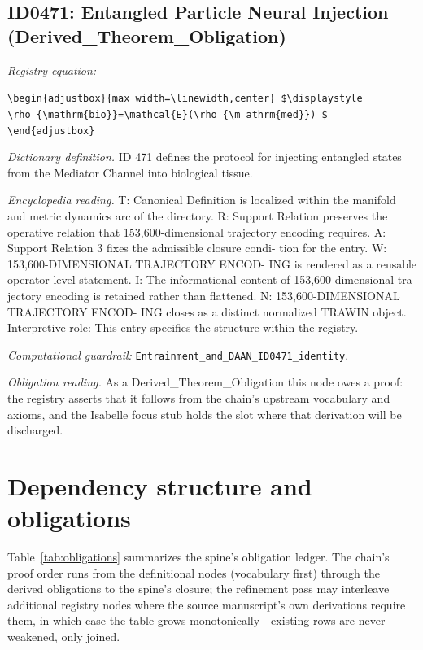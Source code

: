 \documentclass[11pt]{article}
\theoremstyle{remark}
\begin{document}
\subsection{ID0471: Entangled Particle Neural Injection (Derived\_Theorem\_Obligation)}

\noindent\textit{Registry equation:}\par
{\small\texttt{\textbackslash{}begin\{adjustbox\}\{max width=\textbackslash{}linewidth,center\} \$\textbackslash{}displaystyle \textbackslash{}rho\_\{\textbackslash{}mathrm\{bio\}\}=\textbackslash{}mathcal\{E\}(\textbackslash{}rho\_\{\textbackslash{}m athrm\{med\}\}) \$ \textbackslash{}end\{adjustbox\}}}\par\medskip
\noindent\textit{Dictionary definition.} ID 471 defines the protocol for injecting entangled states from the Mediator Channel into biological tissue.\par\medskip
\noindent\textit{Encyclopedia reading.} T: Canonical Definition is localized within the manifold and metric dynamics arc of the directory. R: Support Relation preserves the operative relation that 153,600-dimensional trajectory encoding requires. A: Support Relation 3 fixes the admissible closure condi- tion for the entry. W: 153,600-DIMENSIONAL TRAJECTORY ENCOD- ING is rendered as a reusable operator-level statement. I: The informational content of 153,600-dimensional tra- jectory encoding is retained rather than flattened. N: 153,600-DIMENSIONAL TRAJECTORY ENCOD- ING closes as a distinct normalized TRAWIN object. Interpretive role: This entry specifies the structure within the registry.
\par\medskip\noindent\textit{Computational guardrail:} \texttt{Entrainment\_and\_DAAN\_ID0471\_identity}.
\par\medskip\noindent\textit{Obligation reading.} As a Derived\_Theorem\_Obligation this node owes a proof: the registry asserts that it follows from the chain's upstream vocabulary and axioms, and the Isabelle focus stub holds the slot where that derivation will be discharged.

\section{Dependency structure and obligations}
\label{sec:dep}

Table~\ref{tab:obligations} summarizes the spine's obligation ledger. The chain's proof order runs from the definitional nodes (vocabulary first) through the derived obligations to the spine's closure; the refinement pass may interleave additional registry nodes where the source manuscript's own derivations require them, in which case the table grows monotonically---existing rows are never weakened, only joined.
\end{document}
